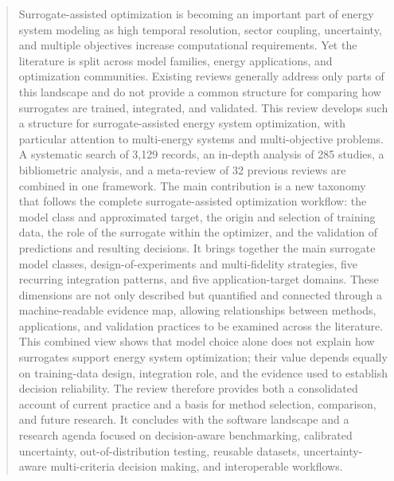 \begin{abstract}
Surrogate-assisted optimization is becoming an important part of energy system modeling as high temporal resolution, sector coupling, uncertainty, and multiple objectives increase computational requirements. Yet the literature is split across model families, energy applications, and optimization communities. Existing reviews generally address only parts of this landscape and do not provide a common structure for comparing how surrogates are trained, integrated, and validated. This review develops such a structure for surrogate-assisted energy system optimization, with particular attention to multi-energy systems and multi-objective problems. A systematic search of 3,129 records, an in-depth analysis of 285 studies, a bibliometric analysis, and a meta-review of 32 previous reviews are combined in one framework. The main contribution is a new taxonomy that follows the complete surrogate-assisted optimization workflow: the model class and approximated target, the origin and selection of training data, the role of the surrogate within the optimizer, and the validation of predictions and resulting decisions. It brings together the main surrogate model classes, design-of-experiments and multi-fidelity strategies, five recurring integration patterns, and five application-target domains. These dimensions are not only described but quantified and connected through a machine-readable evidence map, allowing relationships between methods, applications, and validation practices to be examined across the literature. This combined view shows that model choice alone does not explain how surrogates support energy system optimization; their value depends equally on training-data design, integration role, and the evidence used to establish decision reliability. The review therefore provides both a consolidated account of current practice and a basis for method selection, comparison, and future research. It concludes with the software landscape and a research agenda focused on decision-aware benchmarking, calibrated uncertainty, out-of-distribution testing, reusable datasets, uncertainty-aware multi-criteria decision making, and interoperable workflows.
\end{abstract}
